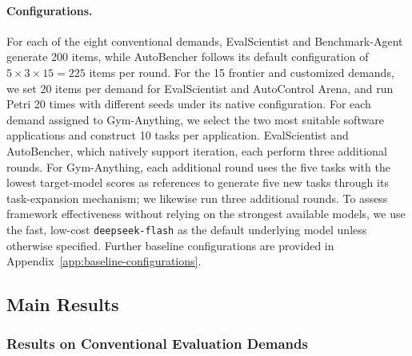 \documentclass{article} %
\begin{document}
	\paragraph{Configurations.}
	For each of the eight conventional demands, EvalScientist and Benchmark-Agent
	generate 200 items, while AutoBencher follows its default configuration of
	$5 \times 3 \times 15 = 225$ items per round. For the 15 frontier and customized
	demands, we set 20 items per demand for EvalScientist and AutoControl Arena, and run
	Petri 20 times with different seeds under its native configuration. For each
	demand assigned to Gym-Anything, we select the two most suitable software
	applications and construct 10 tasks per application. EvalScientist and AutoBencher,
	which natively support iteration, each perform three additional rounds.
	For Gym-Anything, each additional round uses the five tasks with the lowest
	target-model scores as references to generate five new tasks through its
	task-expansion mechanism; we likewise run three additional rounds.
	To assess framework effectiveness without relying on the strongest available
	models, we use the fast, low-cost \texttt{deepseek-flash} as the default
	underlying model unless otherwise specified. Further baseline configurations
	are provided in Appendix~\ref{app:baseline-configurations}.
	\subsection{Main Results}
	\subsubsection{Results on Conventional Evaluation Demands}
	\begin{table}[htbp]
		\centering
		\setlength{\belowcaptionskip}{8pt}
		\caption{Benchmark construction results on conventional evaluation demands.}
		\label{tab:conventional-results}
		\small
		\renewcommand{\arraystretch}{1.4}
		\setlength{\tabcolsep}{6pt}
	\end{table}
	
\end{document}
